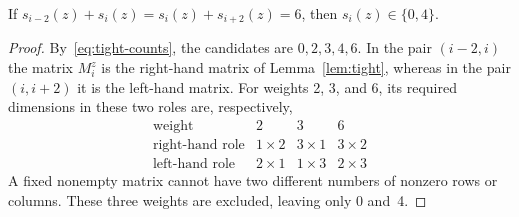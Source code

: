 \begin{corollary}\label{cor:two-tight}
If $s_{i-2}(z)+s_i(z)=s_i(z)+s_{i+2}(z)=6$, then
$s_i(z)\in\{0,4\}$.
\end{corollary}
\begin{proof}
By~\eqref{eq:tight-counts}, the candidates are $0,2,3,4,6$. In the pair
$(i-2,i)$ the matrix $M_i^z$ is the right-hand matrix of
Lemma~\ref{lem:tight}, whereas in the pair $(i,i+2)$ it is the left-hand
matrix. For weights 2, 3, and 6, its required dimensions in these two roles
are, respectively,
\[
\begin{array}{c|ccc}
\text{weight}&2&3&6\\\hline
\text{right-hand role}&1\times2&3\times1&3\times2\\
\text{left-hand role}&2\times1&1\times3&2\times3
\end{array}
\]
A fixed nonempty matrix cannot have two different numbers of nonzero rows
or columns. These three weights are excluded, leaving only 0 and~4.
\end{proof}

